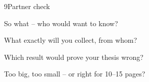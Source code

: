 \begin{wsbox}{9}{Partner check}
\begin{minipage}[t]{0.5\linewidth}\vspace{0pt}
{\small
\cb So what – who would want to know?\par\vspace{0.4mm}
\cb What exactly will you collect, from whom?\par\vspace{0.4mm}
\cb Which result would prove your thesis wrong?\par\vspace{0.4mm}
\cb Too big, too small – or right for 10–15 pages?}
\end{minipage}\hfill
\begin{minipage}[t]{0.47\linewidth}\vspace{0pt}
\end{minipage}
\end{wsbox}



